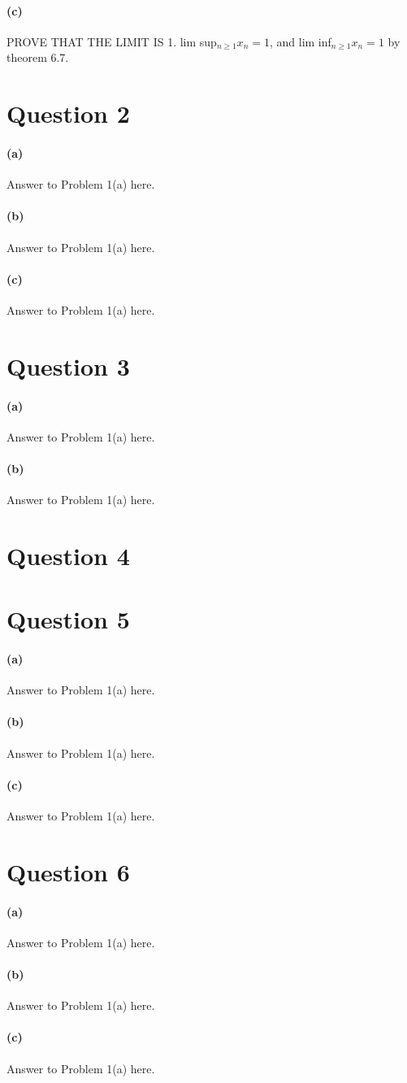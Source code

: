 \documentclass[10pt,letter]{article}
\begin{document}
\paragraph{(c)} PROVE THAT THE LIMIT IS 1. 
lim sup$_{n\geq 1}x_n = 1$, and lim inf$_{n\geq 1}x_n = 1$ by theorem 6.7.


\section*{Question 2}
\paragraph{(a)} Answer to Problem 1(a) here.

\paragraph{(b)} Answer to Problem 1(a) here.
\paragraph{(c)} Answer to Problem 1(a) here.

\section*{Question 3}
\paragraph{(a)} Answer to Problem 1(a) here.
\paragraph{(b)} Answer to Problem 1(a) here.


\section*{Question 4}


\section*{Question 5}
\paragraph{(a)} Answer to Problem 1(a) here.
\paragraph{(b)} Answer to Problem 1(a) here.
\paragraph{(c)} Answer to Problem 1(a) here.


\section*{Question 6}
\paragraph{(a)} Answer to Problem 1(a) here.
\paragraph{(b)} Answer to Problem 1(a) here.
\paragraph{(c)} Answer to Problem 1(a) here.
\end{document}
